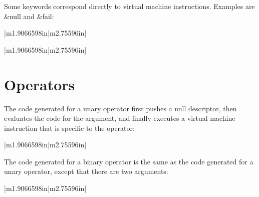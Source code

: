 Some keywords correspond directly to virtual machine
instructions. Examples are \&null and \&fail:

\begin{flushleft}
\tablelasttail{\hline}
\begin{xtabular}{|m{1.9066598in}|m{2.75596in}|}

\end{xtabular}
\end{flushleft}

\bigskip

\begin{flushleft}
\tablelasttail{\hline}
\begin{xtabular}{|m{1.9066598in}|m{2.75596in}|}

\end{xtabular}
\end{flushleft}


\section{Operators}

The code generated for a unary operator first pushes a null
descriptor, then evaluates the code for the argument, and finally
executes a virtual machine instruction that is specific to the
operator:

\begin{flushleft}
\tablelasttail{\hline}
\begin{xtabular}{|m{1.9066598in}|m{2.75596in}|}

\end{xtabular}
\end{flushleft}

The code generated for a binary operator is the same as the code
generated for a unary operator, except that there are two arguments:

\begin{flushleft}
\tablelasttail{\hline}
\begin{xtabular}{|m{1.9066598in}|m{2.75596in}|}

\end{xtabular}
\end{flushleft}


